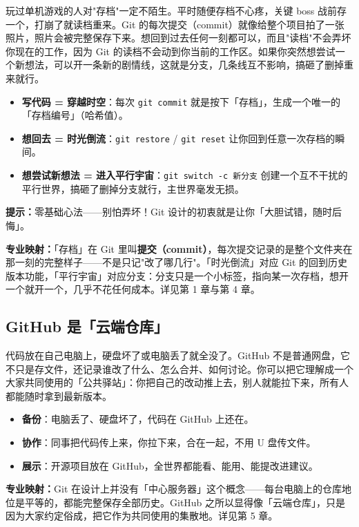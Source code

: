 \documentclass[12pt,a4paper,openany]{ctexbook}
\begin{document}
玩过单机游戏的人对"存档"一定不陌生。平时随便存档不心疼，关键 boss 战前存一个，打崩了就读档重来。Git 的每次提交（commit）就像给整个项目拍了一张照片，照片会被完整保存下来。想回到过去任何一刻都可以，而且"读档"不会弄坏你现在的工作，因为 Git 的读档不会动到你当前的工作区。如果你突然想尝试一个新想法，可以开一条新的剧情线，这就是分支，几条线互不影响，搞砸了删掉重来就行。

\begin{itemize}[leftmargin=2em]
  \item \textbf{写代码 = 穿越时空}：每次 \texttt{git commit} 就是按下「存档」，生成一个唯一的「存档编号」（哈希值）。
  \item \textbf{想回去 = 时光倒流}：\texttt{git restore} / \texttt{git reset} 让你回到任意一次存档的瞬间。
  \item \textbf{想尝试新想法 = 进入平行宇宙}：\texttt{git switch -c 新分支} 创建一个互不干扰的平行世界，搞砸了删掉分支就行，主世界毫发无损。
\end{itemize}

\medskip
\noindent\textbf{提示：}零基础心法——别怕弄坏！Git 设计的初衷就是让你「大胆试错，随时后悔」。
\medskip

\noindent\textbf{专业映射：}「存档」在 Git 里叫\textbf{提交（commit）}，每次提交记录的是整个文件夹在那一刻的完整样子——不是只记"改了哪几行"。「时光倒流」对应 Git 的回到历史版本功能，「平行宇宙」对应分支：分支只是一个小标签，指向某一次存档，想开一个就开一个，几乎不花任何成本。详见第 1 章与第 4 章。
\medskip

\subsection{GitHub 是「云端仓库」}

代码放在自己电脑上，硬盘坏了或电脑丢了就全没了。GitHub 不是普通网盘，它不只是存文件，还记录谁改了什么、怎么合并、如何讨论。你可以把它理解成一个大家共同使用的「公共驿站」：你把自己的改动推上去，别人就能拉下来，所有人都能随时拿到最新版本。

\begin{itemize}[leftmargin=2em]
  \item \textbf{备份}：电脑丢了、硬盘坏了，代码在 GitHub 上还在。
  \item \textbf{协作}：同事把代码传上来，你拉下来，合在一起，不用 U 盘传文件。
  \item \textbf{展示}：开源项目放在 GitHub，全世界都能看、能用、能提改进建议。
\end{itemize}

\medskip
\noindent\textbf{专业映射：}Git 在设计上并没有「中心服务器」这个概念——每台电脑上的仓库地位是平等的，都能完整保存全部历史。GitHub 之所以显得像「云端仓库」，只是因为大家约定俗成，把它作为共同使用的集散地。详见第 5 章。
\medskip
\end{document}
